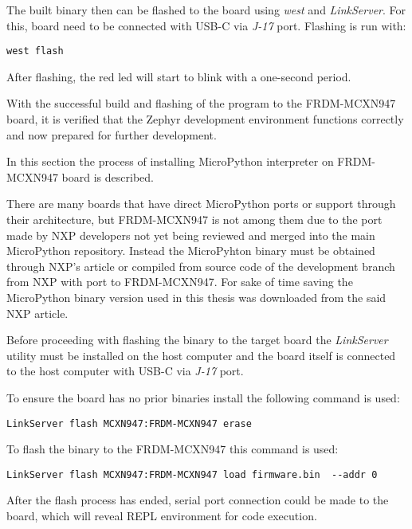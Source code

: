 \documentclass[twoside, 12pt]{article}
\begin{document}
The built binary then can be flashed to the board using \textit{west} and \textit{LinkServer}. For this, board need to be connected with USB-C via \textit{J-17} port.
Flashing is run with:
\begin{lstlisting}[caption=Flashin a program]
west flash
\end{lstlisting}
After flashing, the red led will start to blink with a one-second period.

With the successful build and flashing of the program to the FRDM-MCXN947 board, it is 
verified that the Zephyr development environment functions correctly and now prepared for 
further development.

In this section the process of installing MicroPython interpreter on FRDM-MCXN947 board is 
described.
    
    There are many boards that have direct MicroPython ports or support through their
architecture\cite{mpy_boards}, but FRDM-MCXN947 is not among them due to the port made by NXP 
developers not yet being reviewed and merged into the main MicroPython repository. Instead 
the MicroPyhton binary must be obtained through NXP's article\cite{mcxn947_mpy_bin} or 
compiled from source code of the development branch from NXP with port to FRDM-MCXN947.
For sake of time saving the MicroPython binary version used in this thesis was downloaded 
from the said NXP article.

Before proceeding with flashing the binary to the target board the \textit{LinkServer} 
utility must be installed on the host computer and the board itself is connected to the host 
computer with USB-C via \textit{J-17} port.

To ensure the board has no prior binaries install the following command is used:
\begin{lstlisting}[caption=LinkServer erase]
LinkServer flash MCXN947:FRDM-MCXN947 erase
\end{lstlisting}

To flash the binary to the FRDM-MCXN947 this command is used:
\begin{lstlisting}[caption=LnkServer flasg,breaklines=true]
LinkServer flash MCXN947:FRDM-MCXN947 load firmware.bin  --addr 0
\end{lstlisting}
After the flash process has ended, serial port connection could be made to the board, which will reveal REPL environment for code execution.

\obrazek
{}
\end{document}
